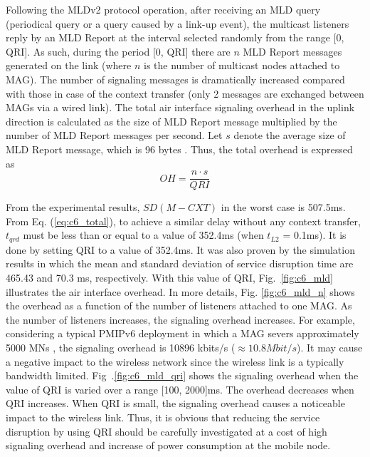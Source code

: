 Following the MLDv2 protocol operation, after receiving an MLD query (periodical query or a query caused by a link-up event), the multicast listeners reply by an MLD Report at the interval selected randomly from the range [0, QRI]. As such, during the period [0, QRI] there are $n$ MLD Report messages generated on the link (where $n$ is the number of multicast nodes attached to MAG). The number of signaling messages is dramatically increased compared with those in case of the context transfer (only 2 messages are exchanged between MAGs via a wired link). 
The total air interface signaling overhead in the uplink direction is calculated as the size of MLD Report message multiplied by the number of MLD Report messages per second. Let $s$ denote the average size of MLD Report message, which is 96 bytes \cite{d4.3}. Thus, the total overhead is expressed as\\
\begin{equation}
OH = \frac{n \cdot s}{QRI}
\end{equation}

From the experimental results, $SD(M-CXT)$ in the worst case is 507.5ms. From Eq. (\ref{eq:c6_total}), to achieve a similar delay without any context transfer, $t_{qrd}$ must be less than or equal to a value of 352.4ms (when $t_{L2}$ = 0.1ms). It is done by setting QRI to a value of 352.4ms. It was also proven by the simulation results in which the mean and standard deviation of service disruption time are 465.43 and 70.3 ms, respectively. With this value of QRI, Fig.~\ref{fig:c6_mld} illustrates the air interface overhead. In more details, Fig. \ref{fig:c6_mld_n} shows the overhead as a function of the number of listeners attached to one MAG. As the number of listeners increases, the signaling overhead increases. For example, considering a typical PMIPv6 deployment in which a MAG severs approximately 5000 MNs \cite{RFC_6224}, the signaling overhead is 10896 kbits/s ($\approx 10.8 Mbit/s$). It may cause a negative impact to the wireless network since the wireless link is a typically bandwidth limited. 
Fig~.\ref{fig:c6_mld_qri} shows the signaling overhead when the value of QRI is varied over a range [100, 2000]ms. The overhead decreases when QRI increases. When QRI is small, the signaling overhead causes a noticeable impact to the wireless link. Thus, it is obvious that reducing the service disruption by using QRI should be carefully investigated at a cost of high signaling overhead and increase of power consumption at the mobile node. 

